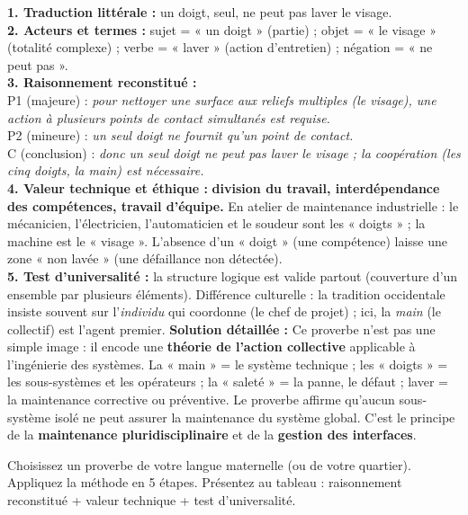 \documentclass[11pt]{article}
\begin{document}
\begin{exoresolu}
\textbf{1. Traduction littérale :} un doigt, seul, ne peut pas laver le visage. \\
\textbf{2. Acteurs et termes :} sujet = « un doigt » (partie) ; objet = « le visage » (totalité complexe) ; verbe = « laver » (action d'entretien) ; négation = « ne peut pas ». \\
\textbf{3. Raisonnement reconstitué :} \\
\quad P1 (majeure) : \emph{pour nettoyer une surface aux reliefs multiples (le visage), une action à plusieurs points de contact simultanés est requise.} \\
\quad P2 (mineure) : \emph{un seul doigt ne fournit qu'un point de contact.} \\
\quad C (conclusion) : \emph{donc un seul doigt ne peut pas laver le visage ; la coopération (les cinq doigts, la main) est nécessaire.} \\
\textbf{4. Valeur technique et éthique :} \textbf{division du travail, interdépendance des compétences, travail d'équipe.} En atelier de maintenance industrielle : le mécanicien, l'électricien, l'automaticien et le soudeur sont les « doigts » ; la machine est le « visage ». L'absence d'un « doigt » (une compétence) laisse une zone « non lavée » (une défaillance non détectée). \\
\textbf{5. Test d'universalité :} la structure logique est valide partout (couverture d'un ensemble par plusieurs éléments). Différence culturelle : la tradition occidentale insiste souvent sur l'\emph{individu} qui coordonne (le chef de projet) ; ici, la \emph{main} (le collectif) est l'agent premier.
\tcblower
\textbf{Solution détaillée :} Ce proverbe n'est pas une simple image : il encode une \textbf{théorie de l'action collective} applicable à l'ingénierie des systèmes. La « main » = le système technique ; les « doigts » = les sous-systèmes et les opérateurs ; la « saleté » = la panne, le défaut ; laver = la maintenance corrective ou préventive. Le proverbe affirme qu'aucun sous-système isolé ne peut assurer la maintenance du système global. C'est le principe de la \textbf{maintenance pluridisciplinaire} et de la \textbf{gestion des interfaces}.
\end{exoresolu}

\begin{exercice}
Choisissez un proverbe de votre langue maternelle (ou de votre quartier). Appliquez la méthode en 5 étapes. Présentez au tableau : raisonnement reconstitué + valeur technique + test d'universalité.
\end{exercice}
\end{document}
